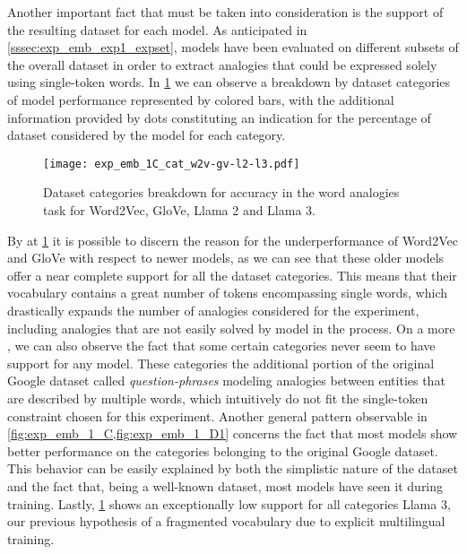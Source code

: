 Another important fact that must be taken into consideration is the support of the resulting dataset for each model.
As anticipated in \cref{sssec:exp_emb_exp1_expset}, models have been evaluated on different subsets of the overall dataset in order to extract analogies that could be expressed solely using single-token words.
In \cref{fig:exp_emb_1_C} we can observe a breakdown by dataset categories of model performance represented by colored bars, with the additional information provided by dots constituting an indication for the percentage of dataset considered by the model for each category.

\begin{figure}[t!]
    \centering
    \texttt{[image: exp\_emb\_1C\_cat\_w2v-gv-l2-l3.pdf]}
    \caption[Dataset categories breakdown for accuracy in the word analogies task for various models.]{Dataset categories breakdown for accuracy in the word analogies task for Word2Vec, GloVe, Llama 2 and Llama 3.}
    \label{fig:exp_emb_1_C}
\end{figure}

By  at \cref{fig:exp_emb_1_C} it is possible to discern the reason for the underperformance of Word2Vec and GloVe with respect to newer models, as we can see that these older models offer a near complete support for all the dataset categories.
This means that their vocabulary contains a great number of tokens encompassing single words, which drastically expands the number of analogies considered for the experiment, including analogies that are not easily solved by model in the process.
On a more , we can also observe the fact that some certain categories never seem to have support for any model.
These categories  the additional portion of the original Google dataset called \emph{question-phrases} modeling analogies between entities that are described by multiple words, which intuitively do not fit the single-token constraint chosen for this experiment.
Another general pattern observable in \cref{fig:exp_emb_1_C,fig:exp_emb_1_D1} concerns the fact that most models show better performance on the categories belonging to the original Google dataset.
This behavior can be easily explained by both the simplistic nature of the dataset and the fact that, being a well-known dataset, most models have seen it during training.
Lastly, \cref{fig:exp_emb_1_C} shows an exceptionally low support for all categories  Llama 3,  our previous hypothesis of a fragmented vocabulary due to explicit multilingual training.

